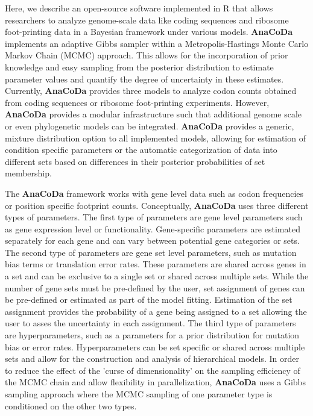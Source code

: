 \documentclass{bioinfo}
\newcommand{\package}{\textbf{AnaCoDa }} %
\begin{document}
Here, we describe an open-source software implemented in R \citep{rcore} that allows researchers to analyze genome-scale data like coding sequences and ribosome foot-printing data in a Bayesian framework under various models. 
\package implements an adaptive Gibbs sampler within a Metropolis-Hastings Monte Carlo Markov Chain (MCMC) approach. This allows for the incorporation of prior knowledge and easy sampling from the posterior distribution to estimate parameter values and quantify the degree of uncertainty in these estimates.
Currently, \package provides three models to analyze codon counts obtained from coding sequences or ribosome foot-printing experiments. However, \package provides a modular infrastructure such that additional genome scale or even phylogenetic models can be integrated. 
\package provides a generic, mixture distribution option to all implemented models, allowing for estimation of condition specific parameters or the automatic categorization of data into different sets based on differences in their posterior probabilities of set membership.

The \package framework works with gene level data such as codon frequencies or position specific footprint counts.
Conceptually, \package uses three different types of parameters.
The first type of parameters are gene level parameters such as gene expression level or functionality.
Gene-specific parameters are estimated separately for each gene and can vary between potential gene categories or sets.
The second type of parameters are gene set level parameters, such as mutation bias terms or translation error rates.
These parameters are shared across genes in a set and can be exclusive to a single set or shared across multiple sets.
While the number of gene sets must be pre-defined by the user, set assignment of genes can be pre-defined or estimated as part of the model fitting.
Estimation of the set assignment provides the probability of a gene being assigned to a set allowing the user to asses the uncertainty in each assignment.
The third type of parameters are hyperparameters, such as a parameters for a prior distribution for mutation bias or error rates.
Hyperparameters can be set specific or shared across multiple sets and allow for the construction and analysis of hierarchical models.
In order to reduce the effect of the 'curse of dimensionality' on the sampling efficiency of the MCMC chain and allow flexibility in parallelization, \package uses a Gibbs sampling approach where the MCMC sampling of one parameter type is conditioned on the other two types.
\end{document}
